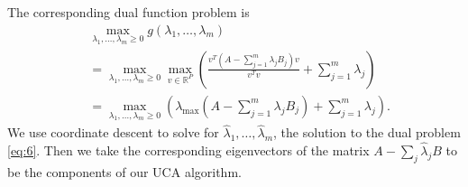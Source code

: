 \documentclass[10pt]{article}
\begin{document}
The corresponding dual function problem is
\begin{align}
    &\max_{\lambda_1,\ldots,\lambda_m \geq 0}{g(\lambda_1,\ldots,\lambda_m)} \nonumber \\ %
   &=\max_{\lambda_1,\ldots,\lambda_m \geq 0}{\max_{v \in \mathbb{R}^P}{\left(\frac{v^T\left(A - \sum^{m}_{j = 1}{\lambda_j B_j}\right)v}{v^T v} + \sum^{m}_{j=1}{\lambda_j}\right)}}\nonumber \\
   &=\max_{\lambda_1,\ldots,\lambda_m \geq 0}{\left(\lambda_{\text{max}}\left(A - \sum^{m}_{j = 1}{\lambda_j B_j}\right) + \sum^{m}_{j=1}{\lambda_j}\right)}.\label{eq:6}
\end{align}
We use coordinate descent to solve for $\hat{\lambda}_1, \ldots, \hat{\lambda}_m$, the solution to the dual problem \eqref{eq:6}. Then we take the corresponding eigenvectors of the matrix  $A - \sum_j \hat{\lambda}_j B$ to be the components of our UCA algorithm. 
\end{document}
